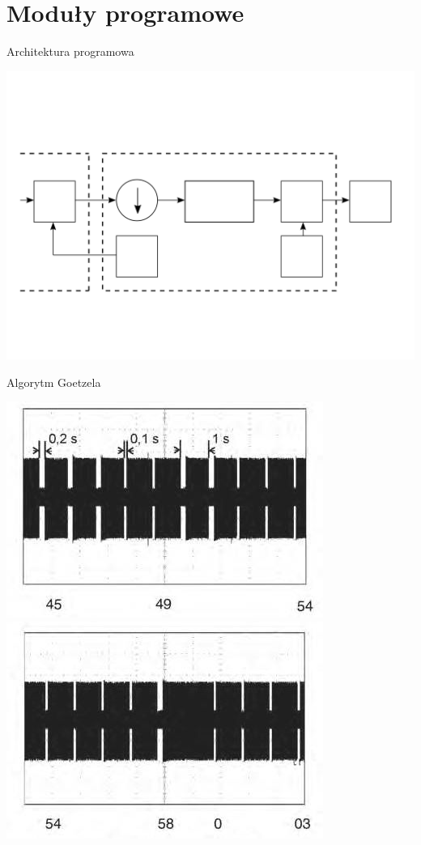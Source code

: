 \section{Moduły programowe}
\begin{frame}{Architektura programowa}
	\begin{center}
		\scalebox{0.43}
		{\includegraphics{images/swModules}}
	\end{center} 
\end{frame}

\begin{frame}{Algorytm Goetzela}
	\begin{center}
		\scalebox{0.43}
		{\includegraphics{images/dcfCarrierEnvelope}
		\includegraphics{images/dcfMinuteMark}}
	\end{center} 
\end{frame}

